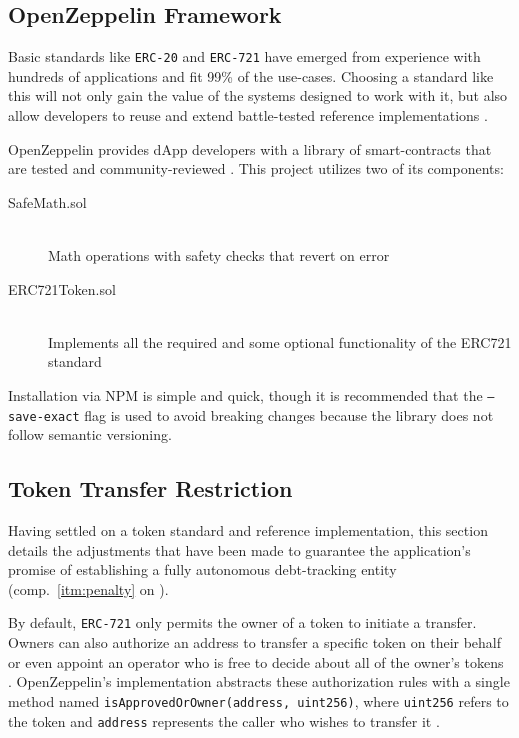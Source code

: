 \subsection{OpenZeppelin Framework}
Basic standards like \texttt{\acs{ERC}-20} and \texttt{\acs{ERC}-721} have emerged from experience with hundreds of applications and fit 99\% of the use-cases. Choosing a standard like this will not only gain the value of the systems designed to work with it, but also allow developers to reuse and extend battle-tested reference implementations \cite[pp.~199--200]{Antonopoulos.2018}. 

OpenZeppelin provides \ac{dApp} developers with a library of smart-contracts that are tested and community-reviewed \cite{openZeppelin}. This project utilizes two of its components:

\begin{description}
  \item[SafeMath.sol]
  \hfill \\
  Math operations with safety checks that revert on error
  \item[ERC721Token.sol]
  \hfill \\Implements all the required and some optional functionality of the ERC721 standard
\end{description}
 
Installation via \acs{NPM} is simple and quick, though it is recommended that the \texttt{--save-exact} flag is used to avoid breaking changes because the library does not follow semantic versioning.
 
\subsection{Token Transfer Restriction}
Having settled on a token standard and reference implementation, this section details the adjustments that have been made to guarantee the application's promise of establishing a fully autonomous debt-tracking entity (comp.~\ref{itm:penalty} on ). 

By default, \texttt{\acs{ERC}-721} only permits the owner of a token to initiate a transfer. Owners can also authorize an address to transfer a specific token on their behalf or even appoint an operator who is free to decide about all of the owner's tokens \cite{erc721}. OpenZeppelin's implementation abstracts these authorization rules with a single method named \texttt{isApprovedOrOwner(address, uint256)}, where \texttt{uint256} refers to the token and \texttt{address} represents the caller who wishes to transfer it \cite{openZeppelinGitHub}.

